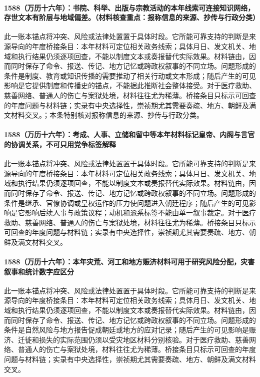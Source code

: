 \paragraph{1588（万历十六年）：书院、科举、出版与宗教活动的本年线索可连接知识网络，存世文本有阶层与地域偏差。（材料核查重点：报称信息的来源、抄传与行政分类）} 此一账本锚点将冲突、风险或法律处置置于具体时段。它所能可靠支持的判断是来源导向的年度桥接条目：本年材料可定位相关政务线索；具体月日、发文机关、地域和执行结果仍须逐项回查，不能以制度文本或奏报替代实际效果。材料链由，因而同时保存了命令、报送、传记、地方记忆或跨政权叙事的不同立场。问题形成的条件是制度、教育或知识传播的需要推动了相关行动或文本形成；随后产生的可见影响是它提供制度和传播史的锚点，不能据此推断社会整体接受。对于医疗救助、慈善网络、普通人的伤亡与案狱处境，材料往往尤为稀薄。桥接条目只标示可回查的年度问题与材料链；实录有中央选择性，崇祯期尤其需要奏疏、地方、朝鲜及满文材料交叉。；本条特别核对报称信息的来源、抄传与行政分类。

\paragraph{1588（万历十六年）：考成、人事、立储和留中等本年材料标记皇帝、内阁与言官的协调关系，不可只用党争标签解释} 此一账本锚点将冲突、风险或法律处置置于具体时段。它所能可靠支持的判断是来源导向的年度桥接条目：本年材料可定位相关政务线索；具体月日、发文机关、地域和执行结果仍须逐项回查，不能以制度文本或奏报替代实际效果。材料链由，因而同时保存了命令、报送、传记、地方记忆或跨政权叙事的不同立场。问题形成的条件是继承、官僚协调或皇权运作的压力使问题进入朝廷程序；随后产生的可见影响是它影响后续人事与政策议程；动机和派系标签不能由单一叙事裁定。对于医疗救助、慈善网络、普通人的伤亡与案狱处境，材料往往尤为稀薄。桥接条目只标示可回查的年度问题与材料链；实录有中央选择性，崇祯期尤其需要奏疏、地方、朝鲜及满文材料交叉。

\paragraph{1588（万历十六年）：本年灾荒、河工和地方赈济材料可用于研究风险分配，灾害叙事和统计数字应区分} 此一账本锚点将冲突、风险或法律处置置于具体时段。它所能可靠支持的判断是来源导向的年度桥接条目：本年材料可定位相关政务线索；具体月日、发文机关、地域和执行结果仍须逐项回查，不能以制度文本或奏报替代实际效果。材料链由，因而同时保存了命令、报送、传记、地方记忆或跨政权叙事的不同立场。问题形成的条件是自然风险与地方报告促成朝廷或地方的应对记录；随后产生的可见影响是赈济、迁徙和损失的实际范围仍须以受灾地区材料分别核验。对于医疗救助、慈善网络、普通人的伤亡与案狱处境，材料往往尤为稀薄。桥接条目只标示可回查的年度问题与材料链；实录有中央选择性，崇祯期尤其需要奏疏、地方、朝鲜及满文材料交叉。

